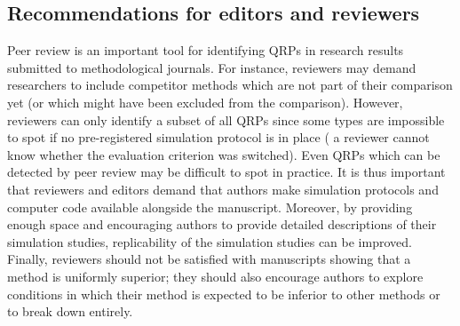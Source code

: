 \documentclass[a4paper, 11pt]{article}
\begin{document}
\subsection{Recommendations for editors and reviewers}
Peer review is an important tool for identifying QRPs in research results 
submitted to methodological journals. 
For instance, reviewers may demand researchers to include competitor 
methods which are not part of their comparison yet (or which might have been 
excluded from the comparison). However, reviewers can only identify a subset 
of all QRPs since some types are impossible to spot if no pre-registered 
simulation protocol is in place (\eg{} a reviewer cannot know whether the evaluation
criterion was switched). Even QRPs which can be detected by peer review
may be difficult to spot in practice.
It is thus important that reviewers and editors demand that authors make
simulation protocols and computer code available alongside the manuscript. 
Moreover, by providing enough space and encouraging authors to provide detailed 
descriptions of their simulation studies, replicability of the simulation 
studies can be improved. Finally, reviewers should not be satisfied with 
manuscripts showing that a method is uniformly superior; they should 
also encourage authors to explore conditions in which their method is
expected to be inferior to other methods or to break down entirely.
\end{document}
